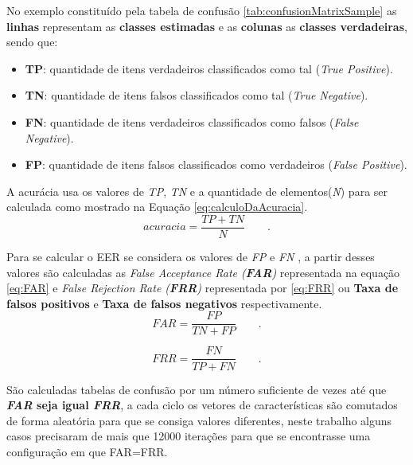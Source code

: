		\par No exemplo constituído pela tabela de confusão \ref{tab:confusionMatrixSample} as \textbf{linhas} representam as \textbf{classes estimadas} e as \textbf{colunas} as \textbf{classes verdadeiras}, sendo que:
		\begin{itemize}
			\item \textbf{TP}: quantidade de itens verdadeiros classificados como tal (\textit{True Positive}).
			\item \textbf{TN}: quantidade de itens falsos classificados como tal (\textit{True Negative}).
			\item \textbf{FN}: quantidade de itens verdadeiros classificados como falsos (\textit{False Negative}).
			\item \textbf{FP}: quantidade de itens falsos classificados como verdadeiros (\textit{False Positive}).
		\end{itemize} 
		
		
		\par A acurácia usa os valores de \textit{TP}, \textit{TN} e a quantidade de elementos(\textit{N}) para ser calculada como mostrado na Equação \ref{eq:calculoDaAcuracia}.\\
		
		\begin{equation}
			acuracia = \dfrac{TP + TN}{N} \qquad.
			\label{eq:calculoDaAcuracia}
		\end{equation}

		\par Para se calcular o EER se considera os valores de \textit{FP} e \textit{FN} \cite{ghazali2018recent}, a partir desses valores são calculadas as \textit{False Acceptance Rate (\textbf{FAR})} representada na equação \ref{eq:FAR} e \textit{False Rejection Rate (\textbf{FRR})} representada por \ref{eq:FRR} ou \textbf{Taxa de falsos positivos} e \textbf{Taxa de falsos negativos} respectivamente.\\
		
		\begin{equation}
			FAR=\dfrac{FP}{TN+FP} \qquad.
			\label{eq:FAR}
		\end{equation}
		
		\begin{equation}
			FRR=\dfrac{FN}{TP+FN} \qquad.
			\label{eq:FRR}
		\end{equation}
				
		\par São calculadas tabelas de confusão por um número suficiente de vezes até que \textbf{\textit{FAR} seja igual \textit{FRR}}, a cada ciclo os vetores de características são comutados de forma aleatória para que se consiga valores diferentes, neste trabalho alguns casos precisaram de mais que 12000 iterações para que se encontrasse uma configuração em que FAR=FRR.\\
		
